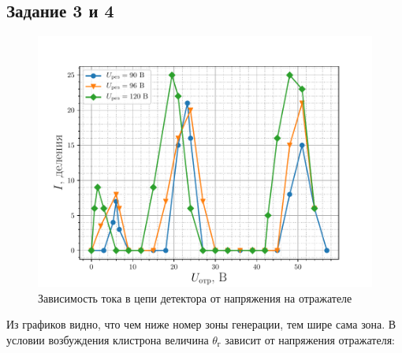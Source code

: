 \subsection{Задание 3 и 4}


\begin{figure}[H]
		\centering
		\includegraphics[width=\linewidth]{fig/task3a}
		\caption{Зависимость тока в цепи детектора от напряжения на отражателе}
		\label{fig:task3a}
\end{figure}
 
 Из графиков видно, что чем ниже номер зоны генерации, тем шире сама зона. В условии возбуждения клистрона величина $\theta _ { \text{г} }$ зависит от напряжения отражателя:

